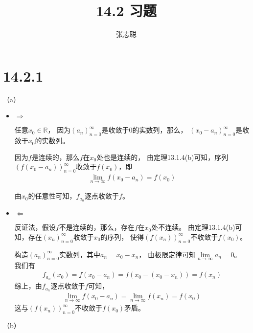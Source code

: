 \documentclass{article}
\begin{document}
\title{14.2 习题}
\author{张志聪}
\maketitle

\section*{14.2.1}

（a）
\begin{itemize}
  \item $\Rightarrow$

        任意$x_0 \in \mathbb{R}$，
        因为$(a_n)_{n = 0}^\infty$是收敛于$0$的实数列，那么，
        $(x_0 - a_n)_{n = 0}^\infty$是收敛于$x_0$的实数列。

        因为$f$是连续的，那么$f$在$x_0$处也是连续的，
        由定理13.1.4(b)可知，序列$(f(x_0 - a_n))_{n = 0}^\infty$收敛于$f(x_0)$，即
        \begin{align*}
          \lim_{n \to \infty}f(x_0 - a_n) = f(x_0)
        \end{align*}

        由$x_0$的任意性可知，$f_{a_n}$逐点收敛于$f$。

  \item $\Leftarrow$

        反证法，假设$f$不是连续的，那么，存在$f$在$x_0$处不连续。
        由定理13.1.4(b)可知，存在$(x_n)_{n = 0}^\infty$收敛于$x_0$的序列，
        使得$(f(x_n))_{n = 0}^\infty$不收敛于$f(x_0)$。

        构造$(a_n)_{n = 0}^\infty$实数列，其中$a_n = x_0 - x_n$，
        由极限定律可知$\lim\limits_{n \to \infty}a_n = 0$。
        我们有
        \begin{align*}
          f_{a_n}(x_0) = f(x_0 - a_n) = f(x_0 - (x_0 - x_n)) = f(x_n)
        \end{align*}
        综上，由$f_{a_n}$逐点收敛于$f$可知，
        \begin{align*}
          \lim_{n \to \infty}f(x_0 - a_n) = \lim_{n \to \infty}f(x_n) = f(x_0)
        \end{align*}
        这与$(f(x_n))_{n = 0}^\infty$不收敛于$f(x_0)$矛盾。
\end{itemize}

（b）
\end{document}
